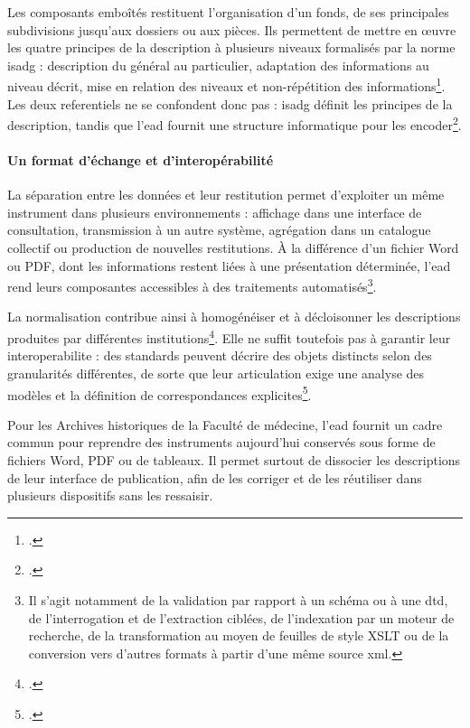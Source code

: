 Les composants emboîtés restituent l'organisation d'un fonds, de ses principales subdivisions jusqu'aux dossiers ou aux pièces. Ils permettent de mettre en œuvre les quatre principes de la description à plusieurs niveaux formalisés par la norme \gls{isadg} : description du général au particulier, adaptation des informations au niveau décrit, mise en relation des niveaux et non-répétition des informations\footcite[pp.~12--13]{ISADG2000}. Les deux \glspl{referentiel} ne se confondent donc pas : \gls{isadg} définit les principes de la description, tandis que l'\gls{ead} fournit une structure informatique pour les encoder\footcite{EAD2002Dictionnaire}.

\paragraph{Un format d'échange et d'interopérabilité}

La séparation entre les données et leur restitution permet d'exploiter un même instrument dans plusieurs environnements : affichage dans une interface de consultation, transmission à un autre système, agrégation dans un catalogue collectif ou production de nouvelles restitutions. À la différence d'un fichier Word ou PDF, dont les informations restent liées à une présentation déterminée, l'\gls{ead} rend leurs composantes accessibles à des traitements automatisés\footnote{Il s'agit notamment de la validation par rapport à un schéma ou à une \gls{dtd}, de l'interrogation et de l'extraction ciblées, de l'indexation par un moteur de recherche, de la transformation au moyen de feuilles de style XSLT ou de la conversion vers d'autres formats à partir d'une même source \gls{xml}.}.

La normalisation contribue ainsi à homogénéiser et à décloisonner les descriptions produites par différentes institutions\footcite[pp.~121--122]{Motte2015}. Elle ne suffit toutefois pas à garantir leur \gls{interoperabilite} : des standards peuvent décrire des objets distincts selon des granularités différentes, de sorte que leur articulation exige une analyse des modèles et la définition de correspondances explicites\footcite{MirandaEtAl2025}.

Pour les Archives historiques de la Faculté de médecine, l'\gls{ead} fournit un cadre commun pour reprendre des instruments aujourd'hui conservés sous forme de fichiers Word, PDF ou de tableaux. Il permet surtout de dissocier les descriptions de leur interface de publication, afin de les corriger et de les réutiliser dans plusieurs dispositifs sans les ressaisir.

